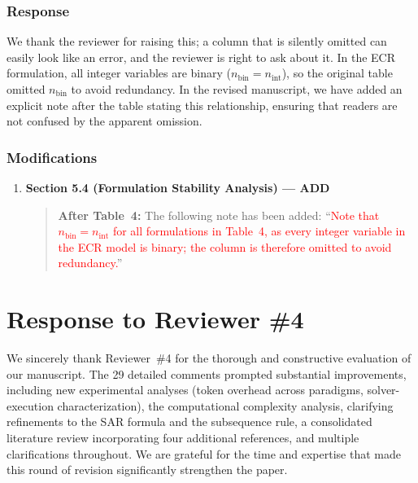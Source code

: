 \documentclass[11pt,a4paper]{article}
\begin{document}
\subsubsection{Response}
We thank the reviewer for raising this; a column that is silently omitted can easily look like an error, and the reviewer is right to ask about it. In the ECR formulation, all integer variables are binary ($n_{\text{bin}}=n_{\text{int}}$), so the original table omitted $n_{\text{bin}}$ to avoid redundancy. In the revised manuscript, we have added an explicit note after the table stating this relationship, ensuring that readers are not confused by the apparent omission.

\subsubsection{Modifications}
\begin{enumerate}
\item \textbf{Section 5.4 (Formulation Stability Analysis) --- ADD}
\begin{quote}
\textbf{After Table~4:} The following note has been added: ``\textcolor{red}{Note that $n_{\text{bin}}=n_{\text{int}}$ for all formulations in Table~4, as every integer variable in the ECR model is binary; the column is therefore omitted to avoid redundancy.}''
\end{quote}
\end{enumerate}


\section{Response to Reviewer \#4}

We sincerely thank Reviewer~\#4 for the thorough and constructive evaluation of our manuscript. The 29 detailed comments prompted substantial improvements, including new experimental analyses (token overhead across paradigms, solver-execution characterization), the computational complexity analysis, clarifying refinements to the SAR formula and the subsequence rule, a consolidated literature review incorporating four additional references, and multiple clarifications throughout. We are grateful for the time and expertise that made this round of revision significantly strengthen the paper.

\end{document}
